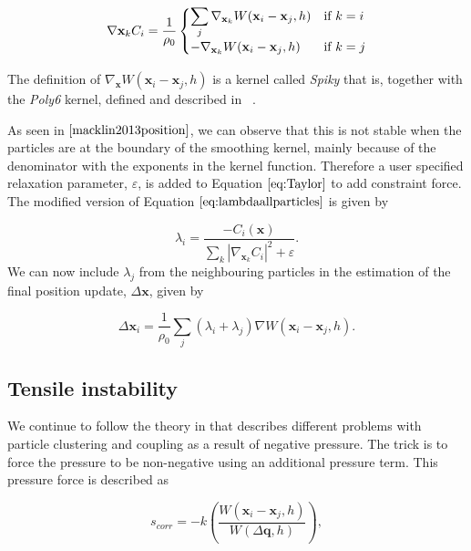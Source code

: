 \begin{equation}
 \nabla \mathbf{x}_k C_i = \frac{1}{\rho_0}
  \begin{cases}
  \label{eq:NablaC}
  \displaystyle \sum\limits_{j} \nabla_{\mathbf{x}_k} W(\mathbf{x}_i - \mathbf{x}_j, h) & $\text{if }$ k = i \\
  - \nabla_{\mathbf{x}_k} W(\mathbf{x}_i - \mathbf{x}_j, h) & $\text{if }$ k = j \\
  \end{cases}
\end{equation}

The definition of $ \nabla_{\mathbf{x}} W(\mathbf{x}_i - \mathbf{x}_j, h) $ is a
kernel called \textit{Spiky} that is, together with the \textit{Poly6}
kernel, defined and described in ~\cite{muller2003particle}.

As seen in $\cite{macklin2013position}$, we can observe that this is not stable
when the particles are at the boundary of the smoothing kernel, mainly because
of the denominator with the exponents in the kernel function.  Therefore a user
specified relaxation parameter, $\varepsilon$, is added to Equation $\ref{eq:Taylor}$ to add constraint force. The modified version of Equation $\ref{eq:lambdaallparticles}$ is given by

\begin{equation}
\label{eq:LambdaEpsilon}
\lambda_i = \frac{- C_i(\mathbf{x}) }{ \sum\limits_{k} |\nabla_{\mathbf{x}_k} C_i|^2 + \varepsilon}.
\end{equation}
We can now include $\lambda_j$ from the neighbouring particles in the
estimation of the final position update, $\Delta \mathbf{x}$, given by

\begin{equation}
\label{eq:DeltaP}
\Delta \mathbf{x}_i = \frac{1}{\rho_0} \sum\limits_{j} (\lambda_i + \lambda_j) \nabla W(\mathbf{x}_i - \mathbf{x}_j, h).
\end{equation}

\subsection{Tensile instability} We continue to follow the theory in
\cite{macklin2013position} that describes different problems with particle clustering and coupling as a result of negative pressure. The trick is to force the pressure to be non-negative using an additional pressure term. This pressure
force is described as

\begin{equation}
\label{eq:Scorr}
s_{corr} = -k \left( \frac{W(\mathbf{x}_i - \mathbf{x}_j, h)}{W(\Delta \mathbf{q}, h)} \right),
\end{equation}

